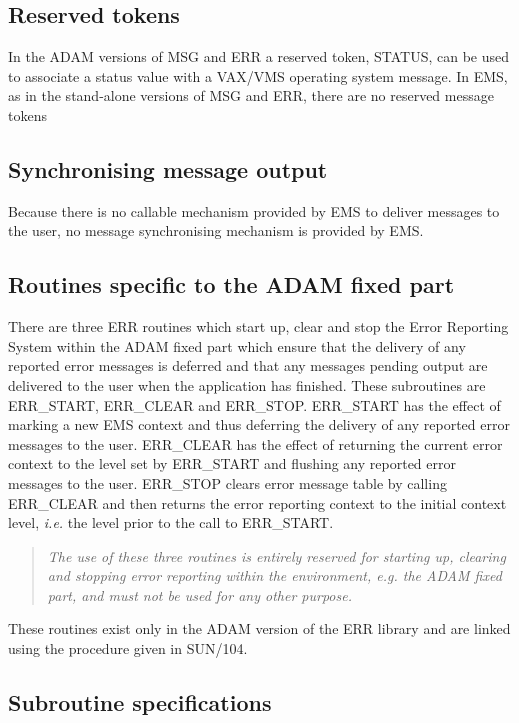 \subsection {Reserved tokens}

In the ADAM versions of MSG and ERR a reserved token, STATUS, can be used 
to associate a status value with a VAX/VMS operating system message.
In EMS, as in the stand-alone versions of MSG and ERR, there are no reserved
message tokens


\subsection {Synchronising message output}

Because there is no callable mechanism provided by EMS to deliver messages to
the user, no message synchronising mechanism is provided by EMS.


\subsection {Routines specific to the ADAM fixed part}

There are three ERR routines which start up, clear and stop the Error Reporting
System within the ADAM fixed part which ensure that the delivery of any 
reported error messages is deferred and that any messages pending output are 
delivered to the user when the application has finished.
These subroutines are ERR\_START, ERR\_CLEAR and ERR\_STOP.
ERR\_START has the effect of marking a new EMS context and thus deferring the
delivery of any reported error messages to the user.
ERR\_CLEAR has the effect of returning the current error context to the level
set by ERR\_START and flushing any reported error messages to the user.
ERR\_STOP clears error message table by calling ERR\_CLEAR and then returns the 
error reporting context to the initial context level, {\em i.e.} the level
prior to the call to ERR\_START.

\begin {quote}
{\em The use of these three routines is entirely reserved for starting up, 
clearing and 
stopping error reporting within the environment, {\em e.g.} the ADAM fixed 
part, and must not be used for any other purpose.}
\end {quote}

These routines exist only in the ADAM version of the ERR library and are linked
using the procedure given in SUN/104.

\newpage
\subsection {Subroutine specifications}


